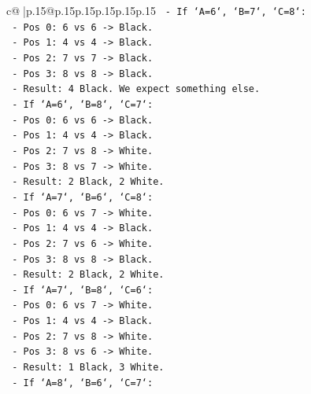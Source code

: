 \documentclass{article}
\begin{document}
{\begin{supertabular}{c@{$\;$}|p{.15\linewidth}@{}p{.15\linewidth}p{.15\linewidth}p{.15\linewidth}p{.15\linewidth}p{.15\linewidth}}
{{{\texttt{                    {-} If `A=6`, `B=7`, `C=8`:} \\
\texttt{                        {-} Pos 0: 6 vs 6 {-}> Black.} \\
\texttt{                        {-} Pos 1: 4 vs 4 {-}> Black.} \\
\texttt{                        {-} Pos 2: 7 vs 7 {-}> Black.} \\
\texttt{                        {-} Pos 3: 8 vs 8 {-}> Black.} \\
\texttt{                        {-} Result: 4 Black. We expect something else.} \\
\texttt{                    {-} If `A=6`, `B=8`, `C=7`:} \\
\texttt{                        {-} Pos 0: 6 vs 6 {-}> Black.} \\
\texttt{                        {-} Pos 1: 4 vs 4 {-}> Black.} \\
\texttt{                        {-} Pos 2: 7 vs 8 {-}> White.} \\
\texttt{                        {-} Pos 3: 8 vs 7 {-}> White.} \\
\texttt{                        {-} Result: 2 Black, 2 White.} \\
\texttt{                    {-} If `A=7`, `B=6`, `C=8`:} \\
\texttt{                        {-} Pos 0: 6 vs 7 {-}> White.} \\
\texttt{                        {-} Pos 1: 4 vs 4 {-}> Black.} \\
\texttt{                        {-} Pos 2: 7 vs 6 {-}> White.} \\
\texttt{                        {-} Pos 3: 8 vs 8 {-}> Black.} \\
\texttt{                        {-} Result: 2 Black, 2 White.} \\
\texttt{                    {-} If `A=7`, `B=8`, `C=6`:} \\
\texttt{                        {-} Pos 0: 6 vs 7 {-}> White.} \\
\texttt{                        {-} Pos 1: 4 vs 4 {-}> Black.} \\
\texttt{                        {-} Pos 2: 7 vs 8 {-}> White.} \\
\texttt{                        {-} Pos 3: 8 vs 6 {-}> White.} \\
\texttt{                        {-} Result: 1 Black, 3 White.} \\
\texttt{                    {-} If `A=8`, `B=6`, `C=7`:} \\
}}}
\end{supertabular}}
\end{document}
